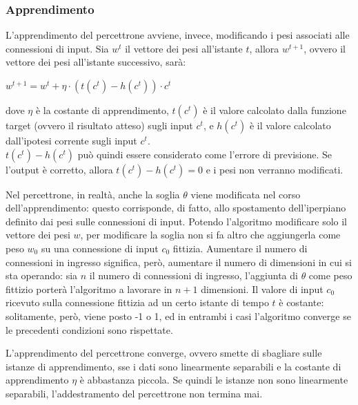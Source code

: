 \subsubsection{Apprendimento}
L'apprendimento del percettrone avviene, invece, modificando i pesi associati alle connessioni di input.
Sia $w^t$ il vettore dei pesi all'istante $t$, allora $w^{t+1}$, ovvero il vettore dei pesi all'istante successivo, sarà:
\begin{center}
    $w^{t+1} = w^t + \eta \cdot (t(c^t) - h(c^t)) \cdot c^t$
\end{center}
dove $\eta$ è la costante di apprendimento, $t(c^t)$ è il valore calcolato dalla funzione target (ovvero il risultato atteso) sugli input $c^t$, e $h(c^t)$ è il valore calcolato dall'ipotesi corrente sugli input $c^t$.\\
$t(c^t) - h(c^t)$ può quindi essere considerato come l'errore di previsione. Se l'output è corretto, allora $t(c^t) - h(c^t) = 0$ e i pesi non verranno modificati.

Nel percettrone, in realtà, anche la soglia $\theta$ viene modificata nel corso dell'apprendimento: questo corrisponde, di fatto, allo spostamento dell'iperpiano definito dai pesi sulle connessioni di input.
Potendo l'algoritmo modificare solo il vettore dei pesi $w$, per modificare la soglia non si fa altro che aggiungerla come peso $w_0$ su una connessione di input $c_0$ fittizia. Aumentare il numero di connessioni in ingresso significa, però, aumentare il numero di dimensioni in cui si sta operando: sia $n$ il numero di connessioni di ingresso, l'aggiunta di $\theta$ come peso fittizio porterà l'algoritmo a lavorare in $n+1$ dimensioni.
Il valore di input $c_0$ ricevuto sulla connessione fittizia ad un certo istante di tempo $t$ è costante: solitamente, però, viene posto -1 o 1, ed in entrambi i casi l'algoritmo converge se le precedenti condizioni sono rispettate.

L'apprendimento del percettrone converge, ovvero smette di sbagliare sulle istanze di apprendimento, sse i dati sono linearmente separabili e la costante di apprendimento $\eta$ è abbastanza piccola.
Se quindi le istanze non sono linearmente separabili, l'addestramento del percettrone non termina mai.

